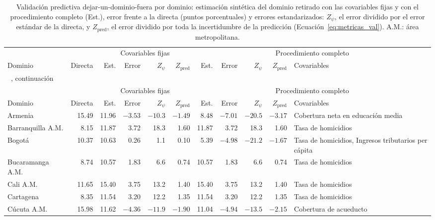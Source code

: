 {\footnotesize\setlength{\tabcolsep}{2pt}
\begin{longtable}{l r r r r r r r r r p{1.75cm}}
\caption[Validación predictiva dejar-un-dominio-fuera por dominio]{Validación predictiva dejar-un-dominio-fuera por dominio: estimación sintética del dominio retirado con las covariables fijas y con el procedimiento completo (Est.), error frente a la directa (puntos porcentuales) y errores estandarizados: $Z_{\psi}$, el error dividido por el error estándar de la directa, y $Z_{\text{pred}}$, el error dividido por toda la incertidumbre de la predicción (Ecuación~\ref{eq:metricas_val}). A.M.: área metropolitana.}
\label{tab:app_validacion} \\
\toprule
& & \multicolumn{4}{c}{Covariables fijas} & \multicolumn{5}{c}{Procedimiento completo} \\
\cmidrule(lr){3-6}\cmidrule(lr){7-11}
Dominio & Directa & Est. & Error & $Z_{\psi}$ & $Z_{\text{pred}}$ & Est. & Error & $Z_{\psi}$ & $Z_{\text{pred}}$ & Covariables \\
\midrule
\endfirsthead
\multicolumn{11}{l}{\tablename~\thetable{}, continuación} \\
\toprule
& & \multicolumn{4}{c}{Covariables fijas} & \multicolumn{5}{c}{Procedimiento completo} \\
\cmidrule(lr){3-6}\cmidrule(lr){7-11}
Dominio & Directa & Est. & Error & $Z_{\psi}$ & $Z_{\text{pred}}$ & Est. & Error & $Z_{\psi}$ & $Z_{\text{pred}}$ & Covariables \\
\midrule
\endhead
\bottomrule
\endlastfoot
Armenia & 15.49 & 11.96 & $-3.53$ & $-10.3$ & $-1.49$ & 8.48 & $-7.01$ & $-20.5$ & $-3.17$ & Cobertura neta en educación media \\
Barranquilla A.M. & 8.15 & 11.87 & 3.72 & 18.3 & 1.60 & 11.87 & 3.72 & 18.3 & 1.60 & Tasa de homicidios \\
Bogotá & 10.37 & 10.63 & 0.26 & 1.1 & 0.10 & 5.39 & $-4.98$ & $-21.2$ & $-1.67$ & Tasa de homicidios, Ingresos tributarios per cápita \\
Bucaramanga A.M. & 8.74 & 10.57 & 1.83 & 6.6 & 0.74 & 10.57 & 1.83 & 6.6 & 0.74 & Tasa de homicidios \\
Cali A.M. & 11.65 & 15.40 & 3.75 & 13.2 & 1.40 & 15.40 & 3.75 & 13.2 & 1.40 & Tasa de homicidios \\
Cartagena & 8.35 & 11.54 & 3.20 & 12.2 & 1.35 & 11.54 & 3.20 & 12.2 & 1.35 & Tasa de homicidios \\
Cúcuta A.M. & 15.98 & 11.62 & $-4.36$ & $-11.9$ & $-1.90$ & 11.04 & $-4.94$ & $-13.5$ & $-2.15$ & Cobertura de acueducto \\

\end{longtable}}
